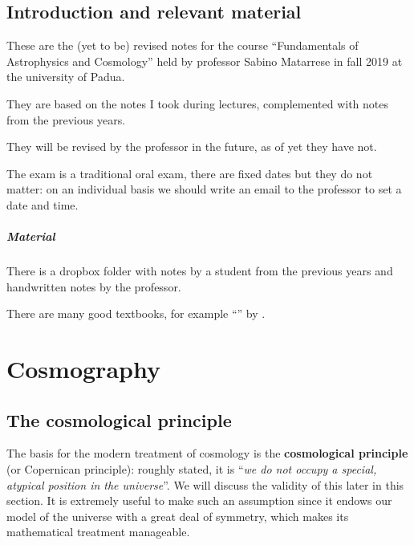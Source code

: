 \documentclass[main.tex]{subfiles}
\begin{document}
\section*{Introduction and relevant material}

These are the
(yet to be)
revised notes for the course ``Fundamentals of Astrophysics and Cosmology'' held by professor Sabino Matarrese in fall 2019 at the university of Padua.

They are based on the notes I took during lectures, complemented with notes from the previous years.

They will be revised by the professor in the future, as of yet they have not.

The exam is a traditional oral exam, there are fixed dates but they do not matter: on an individual basis we should write an email to the professor to set a date and time.

\paragraph{Material}

There is a dropbox folder with notes by a student from the previous years \cite[]{Pacciani:2018} and handwritten notes by the professor.

There are many good textbooks, for example ``'' by \citeauthor{LucchinColes:2002} \cite[]{LucchinColes:2002}.





\chapter{Cosmography}


\section{The cosmological principle}

The basis for the modern treatment of cosmology is the \textbf{cosmological principle} (or Copernican principle):
roughly stated, it is ``\emph{we do not occupy a special, atypical position in the universe}''.
We will discuss the validity of this later in this section.
It is extremely useful to make such an assumption since it endows our model of the universe with a great deal of symmetry, which makes its mathematical treatment manageable. 
\end{document}
